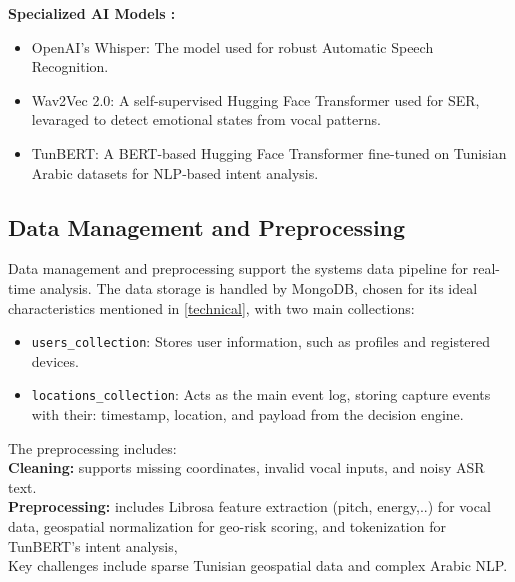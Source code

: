 \documentclass[12pt,a4paper,oneside,english]{book}
\begin{document}
{\textbf{Specialized AI Models :}
\begin{itemize}
\item OpenAI's Whisper: The model used for robust Automatic Speech Recognition.
\item Wav2Vec 2.0: A self-supervised Hugging Face Transformer used for SER, levaraged to detect emotional states from vocal patterns.
\item TunBERT: A BERT-based Hugging Face Transformer fine-tuned on Tunisian Arabic datasets for NLP-based intent analysis.%
\end{itemize}

\subsection{Data Management and Preprocessing}
\label{sec:data_management}
Data management and preprocessing support the systems data pipeline for real-time analysis.
The data storage is handled by MongoDB, chosen for its ideal characteristics mentioned in \ref{technical}, with two main collections:
\begin{itemize}
    \item \texttt{users\_collection}: Stores user information, such as profiles and registered devices.
    \item \texttt{locations\_collection}: Acts as the main event log, storing capture events with their: timestamp, location, and payload from the decision engine.
\end{itemize}

The preprocessing includes: \\
\textbf{Cleaning:} supports missing coordinates, invalid vocal inputs, and noisy ASR text.\\
\textbf{Preprocessing:} includes Librosa feature extraction (pitch, energy,..) for vocal data, geospatial normalization for geo-risk scoring, and tokenization for TunBERT's intent analysis, 
\\  Key challenges include sparse Tunisian geospatial data and complex Arabic NLP.

}
\end{document}
